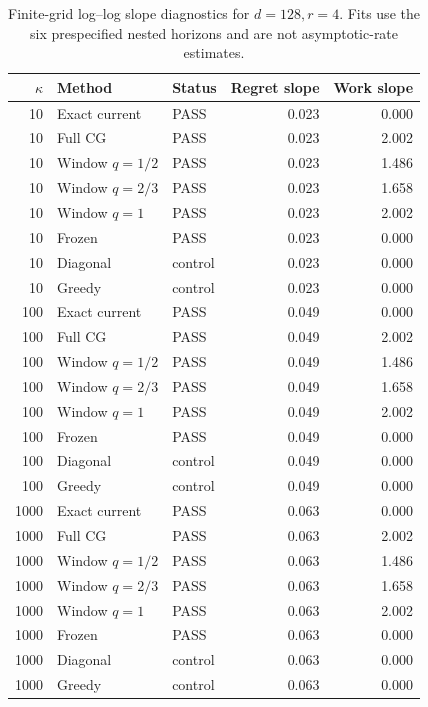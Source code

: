 \begin{table}[p]
\centering\scriptsize
\begin{tabular}{rllrr}
\toprule
$\kappa$ & Method & Status & Regret slope & Work slope \\
\midrule
10 & Exact current & PASS & 0.023 & 0.000 \\
10 & Full CG & PASS & 0.023 & 2.002 \\
10 & Window $q=1/2$ & PASS & 0.023 & 1.486 \\
10 & Window $q=2/3$ & PASS & 0.023 & 1.658 \\
10 & Window $q=1$ & PASS & 0.023 & 2.002 \\
10 & Frozen & PASS & 0.023 & 0.000 \\
10 & Diagonal & control & 0.023 & 0.000 \\
10 & Greedy & control & 0.023 & 0.000 \\
100 & Exact current & PASS & 0.049 & 0.000 \\
100 & Full CG & PASS & 0.049 & 2.002 \\
100 & Window $q=1/2$ & PASS & 0.049 & 1.486 \\
100 & Window $q=2/3$ & PASS & 0.049 & 1.658 \\
100 & Window $q=1$ & PASS & 0.049 & 2.002 \\
100 & Frozen & PASS & 0.049 & 0.000 \\
100 & Diagonal & control & 0.049 & 0.000 \\
100 & Greedy & control & 0.049 & 0.000 \\
1000 & Exact current & PASS & 0.063 & 0.000 \\
1000 & Full CG & PASS & 0.063 & 2.002 \\
1000 & Window $q=1/2$ & PASS & 0.063 & 1.486 \\
1000 & Window $q=2/3$ & PASS & 0.063 & 1.658 \\
1000 & Window $q=1$ & PASS & 0.063 & 2.002 \\
1000 & Frozen & PASS & 0.063 & 0.000 \\
1000 & Diagonal & control & 0.063 & 0.000 \\
1000 & Greedy & control & 0.063 & 0.000 \\
\bottomrule
\end{tabular}
\caption{Finite-grid log--log slope diagnostics for $d=128,r=4$.  Fits use the six prespecified nested horizons and are not asymptotic-rate estimates.}
\label{tab:certified-scaling-fits}
\end{table}

